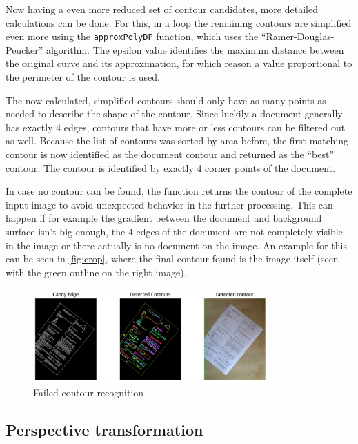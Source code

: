 Now having a even more reduced set of contour candidates, more detailed calculations can be done. For this, in a loop the remaining contours are simplified even more using the \texttt{approxPolyDP} function, which uses the \enquote{Ramer-Douglas-Peucker} algorithm. The epsilon value identifies the maximum distance between the original curve and its approximation, for which reason a value proportional to the perimeter of the contour is used. \cite{cv_approx}

The now calculated, simplified contours should only have as many points as needed to describe the shape of the contour. Since luckily a document generally has exactly 4 edges, contours that have more or less contours can be filtered out as well. Because the list of contours was sorted by area before, the first matching contour is now identified as the document contour and returned as the \enquote{best} contour. The contour is identified by exactly 4 corner points of the document.

In case no contour can be found, the function returns the contour of the complete input image to avoid unexpected behavior in the further processing. This can happen if for example the gradient between the document and background surface isn't big enough, the 4 edges of the document are not completely visible in the image or there actually is no document on the image. An example for this can be seen in \autoref{fig:crop}, where the final contour found is the image itself (seen with the green outline on the right image).

\begin{figure}[h]
    \includegraphics[width=0.8\textwidth]{figures/cut.jpg}
    \centering
    \caption{Failed contour recognition}
    \label{fig:crop}
\end{figure}

\subsection{Perspective transformation}
\label{transf}

